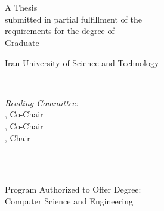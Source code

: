 
\begin{titlepage}
\begin{center}
\vspace*{\fill}
\singlespace
\thispagestyle{empty}
{\LARGE { \thesisTitle \\} %
\doublespacing
\vspace*{\baselineskip}
{\large \authorName }\\ %
\vspace*{1.5\baselineskip}
\large A Thesis
\\ submitted in partial fulfillment of the\\
requirements for the degree of\\
Graduate\\
\vspace{1.5\baselineskip}

Iran University of Science and Technology
\\ \graduationYear}\\ %
\vspace{1.5\baselineskip}

\large \textit{Reading Committee:} \\

\ifdefined\secondAdvisor 
    \advisor, Co-Chair \\
    \secondAdvisor, Co-Chair \\
\else
    \advisor, Chair
\fi

\readingCommitteeOne \\

\ifdefined\readingCommitteeTwo
    \readingCommitteeTwo \\
\fi
    

\vspace{2\baselineskip}
  Program Authorized to Offer Degree: \\
Computer Science and Engineering
  

  
  
  \vspace*{\fill}
  \clearpage
  \thispagestyle{empty}
\end{center}
\end{titlepage}

